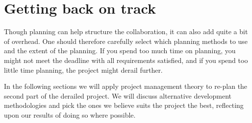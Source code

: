 \section{Getting back on track}
Though planning can help structure the collaboration, it can also add quite a bit of overhead. One should therefore carefully select which planning methods to use and the extent of the planning. If you spend too much time on planning, you might not meet the deadline with all requirements satisfied, and if you spend too little time planning, the project might derail further.

In the following sections we will apply project management theory to re-plan the second part of the derailed project. We will discuss alternative development methodologies and pick the ones we believe suits the project the best, reflecting upon our results of doing so where possible.






\newpage